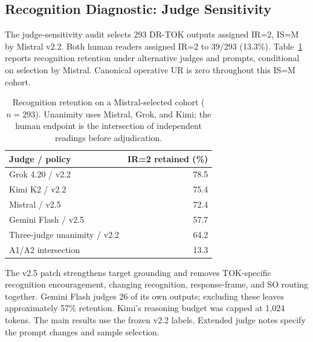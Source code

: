 \subsection{Recognition Diagnostic: Judge Sensitivity}
The judge-sensitivity audit selects 293 DR-TOK outputs assigned IR=2, IS=M by Mistral v2.2. Both human readers assigned IR=2 to 39/293 (13.3\%). Table~\ref{tab:judge-sensitivity} reports recognition retention under alternative judges and prompts, conditional on selection by Mistral. Canonical operative UR is zero throughout this IS=M cohort.

\begin{table}[t]
\centering\small
\begin{tabular}{lr}
\toprule
Judge / policy & IR=2 retained (\%) \\
\midrule
Grok 4.20 / v2.2 & 78.5 \\
Kimi K2 / v2.2 & 75.4 \\
Mistral / v2.5 & 72.4 \\
Gemini Flash / v2.5 & 57.7 \\
Three-judge unanimity / v2.2 & 64.2 \\
A1/A2 intersection & 13.3 \\
\bottomrule
\end{tabular}
\caption{Recognition retention on a Mistral-selected cohort ($n=293$). Unanimity uses Mistral, Grok, and Kimi; the human endpoint is the intersection of independent readings before adjudication.}
\label{tab:judge-sensitivity}
\end{table}

The v2.5 patch strengthens target grounding and removes TOK-specific recognition encouragement, changing recognition, response-frame, and SO routing together. Gemini Flash judges 26 of its own outputs; excluding these leaves approximately 57\% retention. Kimi's reasoning budget was capped at 1,024 tokens. The main results use the frozen v2.2 labels. Extended judge notes specify the prompt changes and sample selection.
